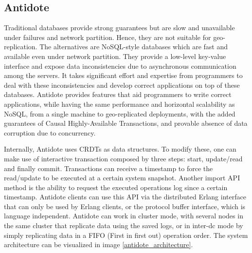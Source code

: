 \subsection{Antidote}
\label{sec:antidote_intro}
Traditional databases provide strong guarantees but are slow and unavailable under failures and network partition. Hence, they are not suitable for geo-replication. The alternatives are NoSQL-style databases which are fast and available even under network partition. They provide a low-level key-value interface and expose data inconsistencies due to asynchronous communication among the servers. It takes significant effort and expertise from programmers to deal with these inconsistencies and develop correct applications on top of these databases. Antidote provides features that aid programmers to write correct applications, while having the same performance and horizontal scalability as NoSQL, from a single machine to geo-replicated deployments, with the added guarantees of Causal Highly-Available Transactions, and provable absence of data corruption due to concurrency.\par
	Internally, Antidote uses CRDTs as data structures. To modify these, one can make use of interactive transaction composed by three steps: start, update/read and finally commit. Transactions can receive a timestamp to force the read/update to be executed at a certain system snapshot. Another import API method is the ability to request the executed operations log since a certain timestamp. Antidote clients can use this API via the distributed Erlang interface that can only be used by Erlang clients, or the protocol buffer interface, which is language independent. Antidote can work in cluster mode, with several nodes in the same cluster that replicate data using the saved logs, or in inter-dc mode by simply replicating data in a FIFO (First in first out) operation order. The system architecture can be visualized in image \ref{antidote_architecture}.

